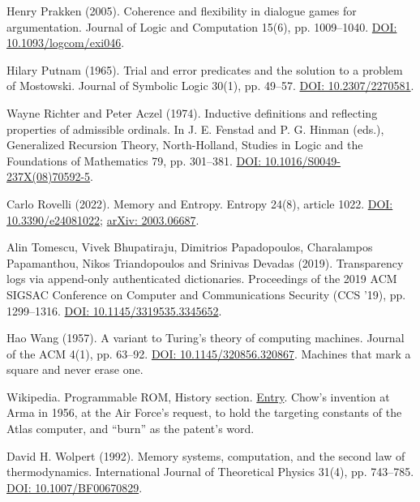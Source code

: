 \noindent Henry Prakken (2005). Coherence and flexibility in dialogue games for argumentation. Journal of Logic and Computation 15(6), pp. 1009--1040. \href{https://doi.org/10.1093/logcom/exi046}{DOI: 10.1093/logcom/exi046}.
\par\medskip

\noindent Hilary Putnam (1965). Trial and error predicates and the solution to a problem of Mostowski. Journal of Symbolic Logic 30(1), pp. 49--57. \href{https://doi.org/10.2307/2270581}{DOI: 10.2307/2270581}.
\par\medskip

\noindent Wayne Richter and Peter Aczel (1974). Inductive definitions and reflecting properties of admissible ordinals. In J. E. Fenstad and P. G. Hinman (eds.), Generalized Recursion Theory, North-Holland, Studies in Logic and the Foundations of Mathematics 79, pp. 301--381. \href{https://doi.org/10.1016/S0049-237X(08)70592-5}{DOI: 10.1016/S0049-237X(08)70592-5}.
\par\medskip

\noindent Carlo Rovelli (2022). Memory and Entropy. Entropy 24(8), article 1022. \href{https://doi.org/10.3390/e24081022}{DOI: 10.3390/e24081022}; \href{https://arxiv.org/abs/2003.06687}{arXiv: 2003.06687}.
\par\medskip

\noindent Alin Tomescu, Vivek Bhupatiraju, Dimitrios Papadopoulos, Charalampos Papamanthou, Nikos Triandopoulos and Srinivas Devadas (2019). Transparency logs via append-only authenticated dictionaries. Proceedings of the 2019 ACM SIGSAC Conference on Computer and Communications Security (CCS '19), pp. 1299--1316. \href{https://doi.org/10.1145/3319535.3345652}{DOI: 10.1145/3319535.3345652}.
\par\medskip

\noindent Hao Wang (1957). A variant to Turing's theory of computing machines. Journal of the ACM 4(1), pp. 63--92. \href{https://doi.org/10.1145/320856.320867}{DOI: 10.1145/320856.320867}. Machines that mark a square and never erase one.
\par\medskip

\noindent Wikipedia. Programmable ROM, History section. \href{https://en.wikipedia.org/wiki/Programmable_ROM}{Entry}. Chow's invention at Arma in 1956, at the Air Force's request, to hold the targeting constants of the Atlas computer, and ``burn'' as the patent's word.
\par\medskip

\noindent David H. Wolpert (1992). Memory systems, computation, and the second law of thermodynamics. International Journal of Theoretical Physics 31(4), pp. 743--785. \href{https://doi.org/10.1007/BF00670829}{DOI: 10.1007/BF00670829}.
\par\medskip

